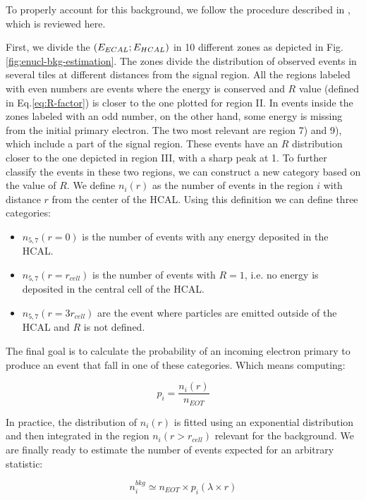 To properly account for this background, we follow the procedure described in \cite{na64-neutrals-study,pdegen-thesis}, which is reviewed here.

First, we divide the $(E_{ECAL};E_{HCAL})$ in 10 different zones as depicted in Fig.\ref{fig:enucl-bkg-estimation}. The zones divide the distribution of observed events in several tiles at different distances from the signal region. All the regions labeled with even numbers are events where the energy is conserved and $R$ value (defined in Eq.\ref{eq:R-factor}) is closer to the one plotted for region II. In events inside the zones labeled with an odd number, on the other hand, some energy is missing from the initial primary electron. The two most relevant are region 7) and 9), which include a part of the signal region. These events have an $R$ distribution closer to the one depicted in region III, with a sharp peak at 1. To further classify the events in these two regions, we can construct a new category based on the value of $R$. We define $n_i(r)$ as the number of events in the region $i$ with distance $r$ from the center of the HCAL. Using this definition we can define three categories:

\begin{itemize}
\item $n_{5,7}(r=0)$ is the number of events with any energy deposited in the HCAL.
\item $n_{5,7}(r=r_{cell})$ is the number of events with $R=1$, i.e. no energy is deposited in the central cell of the HCAL.
\item $n_{5,7}(r=3r_{cell})$ are the event where particles are emitted outside of the HCAL and $R$ is not defined.
\end{itemize}

The final goal is to calculate the probability of an incoming electron primary to produce an event that fall in one of these categories. Which means computing:

\begin{equation}
  \label{eq:enucl-prob}
  p_i = \frac{n_i(r)}{n_{EOT}}
\end{equation}

In practice, the distribution of $n_{i}(r)$ is fitted using an exponential distribution and then integrated in the region $n_i(r>r_{cell})$ relevant for the background. We are finally ready to estimate the number of events expected for an arbitrary statistic:

\begin{equation}
  \label{eq:exp-bkg-inv-2021}
  n^{bkg}_i \simeq n_{EOT} \times p_i(\lambda \times r)
\end{equation}

